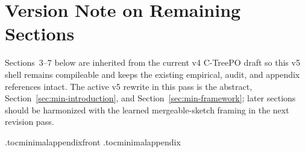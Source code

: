 \documentclass[11pt]{article}
\begin{document}
\clearpage
\section*{Version Note on Remaining Sections}
Sections~3--7 below are inherited from the current v4 C-TreePO draft so this
v5 shell remains compileable and keeps the existing empirical, audit, and
appendix references intact. The active v5 rewrite in this pass is the
abstract, Section~\ref{sec:min-introduction}, and
Section~\ref{sec:min-framework}; later sections should be harmonized with the
learned mergeable-sketch framing in the next revision pass.







\appendix
\etocdepthtag.toc{minimalappendixfront}
\appendixcontents
\etocdepthtag.toc{minimalappendix}













\clearpage


\end{document}
